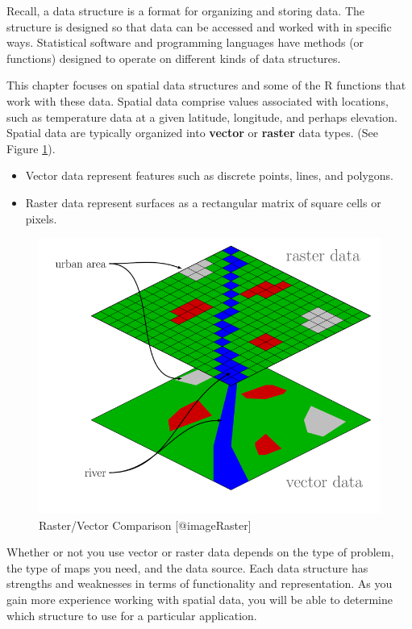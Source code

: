 \documentclass[
]{krantz}
\providecommand{\tightlist}{%
  \setlength{\itemsep}{0pt}\setlength{\parskip}{0pt}}
\begin{document}
Recall, a data structure is a format for organizing and storing data. The structure is designed so that data can be accessed and worked with in specific ways. Statistical software and programming languages have methods (or functions) designed to operate on different kinds of data structures.

This chapter focuses on spatial data structures and some of the R functions that work with these data. Spatial data comprise values associated with locations, such as temperature data at a given latitude, longitude, and perhaps elevation. Spatial data are typically organized into \textbf{vector} or \textbf{raster} data types. (See Figure \ref{fig:raster}).

\begin{itemize}
\tightlist
\item
  Vector data represent features such as discrete points, lines, and polygons.
\item
  Raster data represent surfaces as a rectangular matrix of square cells or pixels.
\end{itemize}

\begin{figure}

{\centering \includegraphics[width=1\linewidth]{../figures/Raster_vector_tikz} 

}

\caption{Raster/Vector Comparison [@imageRaster]}\label{fig:raster}
\end{figure}

Whether or not you use vector or raster data depends on the type of problem, the type of maps you need, and the data source. Each data structure has strengths and weaknesses in terms of functionality and representation. As you gain more experience working with spatial data, you will be able to determine which structure to use for a particular application.
\end{document}
